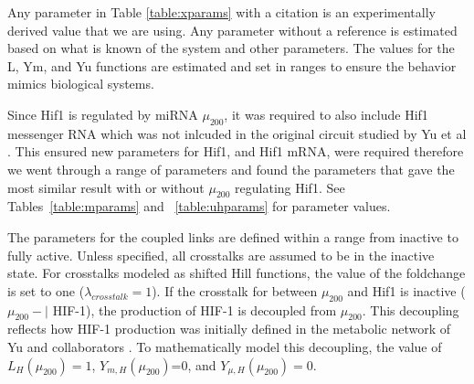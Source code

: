 \documentclass{article}
\begin{document}
Any parameter in Table \ref{table:xparams} with a citation is an experimentally derived value that we are using. 
Any parameter without a reference is estimated based on what is known of the system and other parameters. 
The values for the L, Ym, and Yu functions are estimated and set in ranges to ensure the behavior mimics biological systems.

Since Hif1 is regulated by miRNA $\mu_{200}$, it was required to also include Hif1 messenger RNA which was not inlcuded in the original circuit studied by Yu et al \cite{Yu2017}. 
This ensured new parameters for Hif1, and Hif1 mRNA, were required therefore we went through a range of parameters and found the parameters that gave the most similar result with or without $\mu_{200}$ regulating Hif1. 
See Tables~\ref{table:mparams} and ~\ref{table:uhparams} for parameter values.

The parameters for the coupled links are defined within a range from inactive to fully active. 
Unless specified, all crosstalks are assumed to be in the inactive state. 
For crosstalks modeled as shifted Hill functions, the value of the foldchange is set to one ($\lambda_{crosstalk}=1$).
If the crosstalk for between $\mu_{200}$ and Hif1 is inactive ($\mu_{200}-|$ HIF-1), the production of HIF-1 is decoupled from $\mu_{200}$. 
This decoupling reflects how HIF-1 production was initially defined in the metabolic network of Yu and collaborators \cite{Yu2017}. 
To mathematically model this decoupling, the value of $L_H(\mu_{200})=1$, $Y_{m,H}(\mu_{200})$=0, and $Y_{\mu,H}(\mu_{200})=0$.
\end{document}
